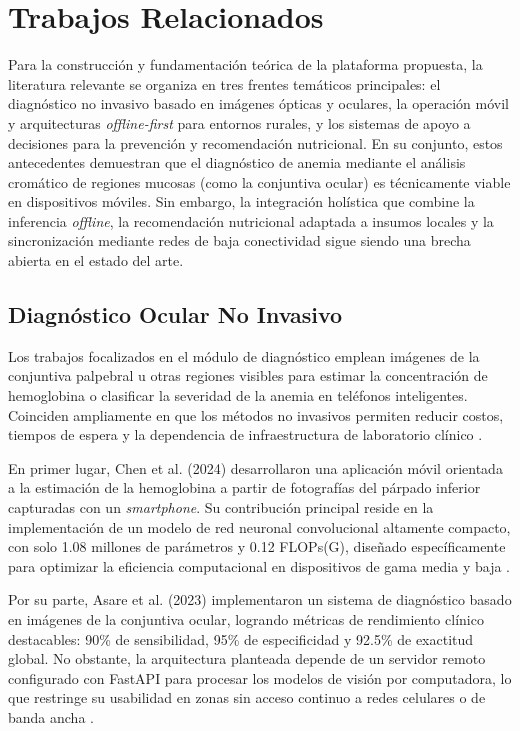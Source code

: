\section{Trabajos Relacionados}
\label{sec:trabajos_relacionados}

Para la construcción y fundamentación teórica de la plataforma propuesta, la literatura relevante se organiza en tres frentes temáticos principales: el diagnóstico no invasivo basado en imágenes ópticas y oculares, la operación móvil y arquitecturas \textit{offline-first} para entornos rurales, y los sistemas de apoyo a decisiones para la prevención y recomendación nutricional. En su conjunto, estos antecedentes demuestran que el diagnóstico de anemia mediante el análisis cromático de regiones mucosas (como la conjuntiva ocular) es técnicamente viable en dispositivos móviles. Sin embargo, la integración holística que combine la inferencia \textit{offline}, la recomendación nutricional adaptada a insumos locales y la sincronización mediante redes de baja conectividad sigue siendo una brecha abierta en el estado del arte.

\subsection{Diagnóstico Ocular No Invasivo}
Los trabajos focalizados en el módulo de diagnóstico emplean imágenes de la conjuntiva palpebral u otras regiones visibles para estimar la concentración de hemoglobina o clasificar la severidad de la anemia en teléfonos inteligentes. Coinciden ampliamente en que los métodos no invasivos permiten reducir costos, tiempos de espera y la dependencia de infraestructura de laboratorio clínico \cite{chen2024, asare2023, dimauro2022}.

En primer lugar, Chen et al. (2024) \cite{chen2024} desarrollaron una aplicación móvil orientada a la estimación de la hemoglobina a partir de fotografías del párpado inferior capturadas con un \textit{smartphone}. Su contribución principal reside en la implementación de un modelo de red neuronal convolucional altamente compacto, con solo 1.08 millones de parámetros y 0.12 FLOPs(G), diseñado específicamente para optimizar la eficiencia computacional en dispositivos de gama media y baja \cite{chen2024}.

Por su parte, Asare et al. (2023) \cite{asare2023} implementaron un sistema de diagnóstico basado en imágenes de la conjuntiva ocular, logrando métricas de rendimiento clínico destacables: 90\% de sensibilidad, 95\% de especificidad y 92.5\% de exactitud global. No obstante, la arquitectura planteada depende de un servidor remoto configurado con FastAPI para procesar los modelos de visión por computadora, lo que restringe su usabilidad en zonas sin acceso continuo a redes celulares o de banda ancha \cite{asare2023}.

